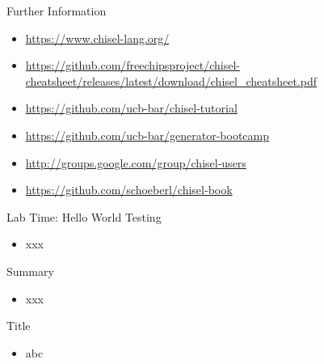 \begin{frame}[fragile]{Further Information}
\begin{itemize}
\item \url{https://www.chisel-lang.org/}
\item \url{https://github.com/freechipsproject/chisel-cheatsheet/releases/latest/download/chisel_cheatsheet.pdf}
\item \url{https://github.com/ucb-bar/chisel-tutorial}
\item \url{https://github.com/ucb-bar/generator-bootcamp}
\item \url{http://groups.google.com/group/chisel-users}
\item \url{https://github.com/schoeberl/chisel-book}
\end{itemize}
\end{frame}


\begin{frame}[fragile]{Lab Time: Hello World Testing}
\begin{itemize}
\item xxx
\end{itemize}
\end{frame}



\begin{frame}[fragile]{Summary}
\begin{itemize}
\item xxx
\end{itemize}
\end{frame}



\begin{frame}[fragile]{Title}
\begin{itemize}
\item abc
\end{itemize}
\end{frame}
